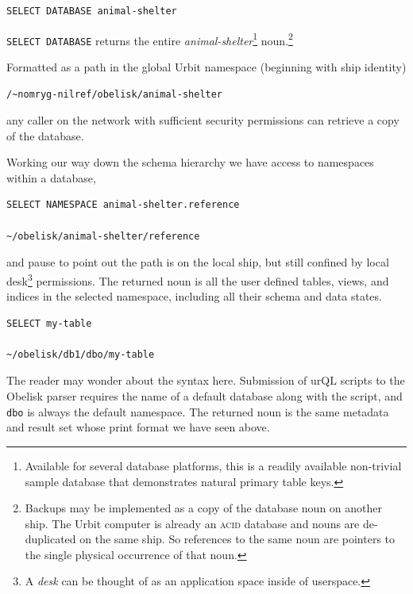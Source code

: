 \documentclass[twoside]{article}
\begin{document}
\begin{lstlisting}[style=listingcode_sql]
SELECT DATABASE animal-shelter
\end{lstlisting}

\noindent
\lstinline[style=inlinecode]{SELECT DATABASE} returns the entire \emph{animal-shelter}\footnote{\citet{Levin2020} Available for several database platforms, this is a readily available non-trivial sample database that demonstrates natural primary table keys.} noun.\footnote{Backups may be implemented as a copy of the database noun on another ship. The Urbit computer is already an \textsc{acid} database and nouns are de-duplicated on the same ship. So references to the same noun are pointers to the single physical occurrence of that noun.}

Formatted as a path in the global Urbit namespace (beginning with ship identity)

\begin{lstlisting}[style=listingcode_sql]
/~nomryg-nilref/obelisk/animal-shelter
\end{lstlisting}

\noindent
any caller on the network with sufficient security permissions can retrieve a copy of the database.

Working our way down the schema hierarchy we have access to namespaces within a database,

\begin{lstlisting}[style=listingcode_sql]
SELECT NAMESPACE animal-shelter.reference

~/obelisk/animal-shelter/reference
\end{lstlisting}

\noindent
and pause to point out the path is on the local ship, but still confined by local desk\footnote{A \emph{desk} can be thought of as an application space inside of userspace.} permissions. The returned noun is all the user defined tables, views, and indices in the selected namespace, including all their schema and data states.

\begin{lstlisting}[style=listingcode_sql]
SELECT my-table

~/obelisk/db1/dbo/my-table
\end{lstlisting}

\noindent
The reader may wonder about the syntax here. Submission of urQL scripts to the Obelisk parser requires the name of a default database along with the script, and \lstinline[style=inlinecode]{dbo} is always the default namespace. The returned noun is the same metadata and result set whose print format we have seen above.
\end{document}
